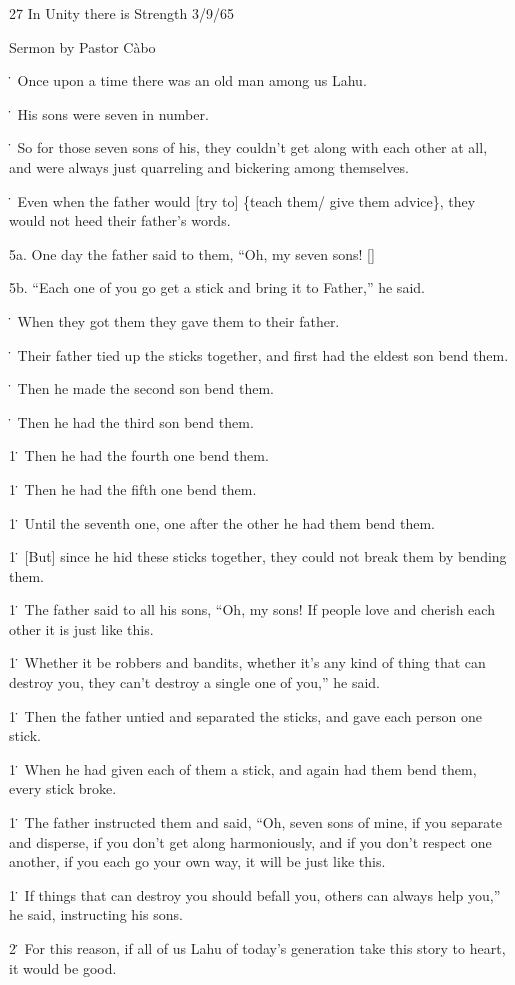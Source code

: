 
27 In Unity there is Strength 3/9/65

Sermon by Pastor Càbo

\. Once upon a time there was an old man among us Lahu.

\. His sons were seven in number.

\. So for those seven sons of his, they couldn't get along with each other at all,
and were always just quarreling and bickering among themselves.

\. Even when the father would [try to] \{teach them/ give them advice\}, they would
not heed their father's words.

5a. One day the father said to them, ``Oh, my seven sons! []

5b. ``Each one of you go get a stick and bring it to Father,'' he said.

\. When they got them they gave them to their father.

\. Their father tied up the sticks together, and first had the eldest son bend
them.

\. Then he made the second son bend them.

\. Then he had the third son bend them.

1\. Then he had the fourth one bend them.

1\. Then he had the fifth one bend them.

1\. Until the seventh one, one after the other he had them bend them.

1\. [But] since he hid these sticks together, they could not break them by bending
them.

1\. The father said to all his sons, ``Oh, my sons! If people love and cherish
each other it is just like this.

1\. Whether it be robbers and bandits, whether it's any kind of thing that can
destroy you, they can't destroy a single one of you,'' he said.

1\. Then the father untied and separated the sticks, and gave each person one stick.

1\. When he had given each of them a stick, and again had them bend them, every
stick broke.

1\. The father instructed them and said, ``Oh, seven sons of mine, if you separate
and disperse, if you don't get along harmoniously, and if you don't respect one
another, if you each go your own way, it will be just like this.

1\. If things that can destroy you should befall you, others can always help you,''
he said, instructing his sons.

2\. For this reason, if all of us Lahu of today's generation take this story to
heart, it would be good.

